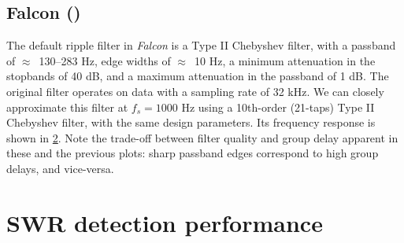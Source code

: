 \begin{figure}
\label{fig:dutta}
\end{figure}


\subsection{Falcon ()}

The default ripple filter in \emph{Falcon} is a Type II Chebyshev filter, with a passband of $\approx$~130--283 Hz, edge widths of $\approx$~10 Hz, a minimum attenuation in the stopbands of 40 dB, and a maximum attenuation in the passband of 1 dB. The original filter operates on data with a sampling rate of 32 kHz. We can closely approximate this filter at $f_s = 1000$ Hz using a 10th-order (21-taps) Type II Chebyshev filter, with the same design parameters. Its frequency response is shown in \cref{fig:falcon}. Note the trade-off between filter quality and group delay apparent in these and the previous plots: sharp passband edges correspond to high group delays, and vice-versa.

\begin{figure}
\label{fig:falcon}
\end{figure}



\section{SWR detection performance}

\begin{figure}
\label{fig:BPF-outputs}
\end{figure}

\begin{figure}
\captionn{}{}
\label{fig:BPF-performance}
\end{figure}





